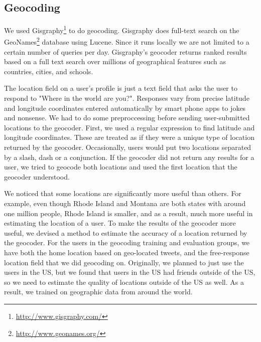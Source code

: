 \documentclass{sig-alternate}
\begin{document}
\subsection{Geocoding}
We used Gisgraphy\footnote{\url{http://www.gisgraphy.com/}} to do geocoding.
Gisgraphy does full-text search on the GeoNames\footnote{\url{http://www.geonames.org/}}
database using Lucene. Since
it runs locally we are not limited to a certain number of queries per day.
Gisgraphy's geocoder returns ranked results based on a full text search
over millions of geographical features such as countries, cities, and schools. 

The location field on a user's profile is just a text field that asks the user to respond to "Where in the world are you?".
Responses vary from precise latitude and longitude coordinates entered automatically by smart phone apps to jokes and nonsense.
We had to do some preproccessing before sending user-submitted locations to the geocoder.
First, we used a regular expression to find latitude and longitude coordinates. These are treated as if they were a unique type of location returned by the geocoder.
Occasionally, users would put two locations separated by a slash, dash or a conjunction. If the geocoder did not return any results for a user, we tried to geocode both locations and used the first location that the geocoder understood.

We noticed that some locations are significantly more useful than others.
For example, even though Rhode Island and Montana are both states with around
one million people, Rhode Island is smaller, and as a result, much more useful
in estimating the location of a user.
To make the results of the geocoder more useful, we devised a method to estimate the accuracy of a location returned by the geocoder.
For the users in the geocoding training and evaluation groups, we have both the
home location based on geo-located tweets, and the free-response location field
that we did geocoding on.
Originally, we planned to just use the users in the US, but we found that users
in the US had friends outside of the US, so we need to estimate the quality of
locations outside of the US as well.
As a result, we trained on geographic data from around the world.
\end{document}

